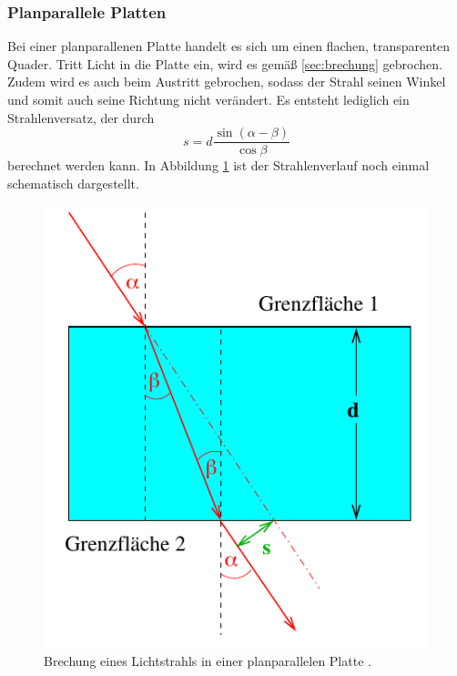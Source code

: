 \subsubsection*{Planparallele Platten}
\label{sec:platten}
Bei einer planparallenen Platte handelt es sich um einen flachen, transparenten Quader. Tritt Licht in die Platte ein, wird
es gemäß \ref{sec:brechung} gebrochen. Zudem wird es auch beim Austritt gebrochen, sodass der Strahl seinen Winkel und
somit auch seine Richtung nicht verändert. Es entsteht lediglich ein Strahlenversatz, der durch
\begin{equation}
    s=d\frac{\sin(\alpha-\beta)}{\cos\beta}
    \label{eqn:strahlenversatz}
\end{equation}
berechnet werden kann. In Abbildung \ref{fig:platten} ist der Strahlenverlauf noch einmal schematisch dargestellt.
\begin{figure}[H]
    \centering
    \includegraphics[scale = 0.5]{pictures/Platte.png}
    \caption{Brechung eines Lichtstrahls in einer planparallelen Platte \cite{AP01}.}
    \label{fig:platten}
\end{figure}

